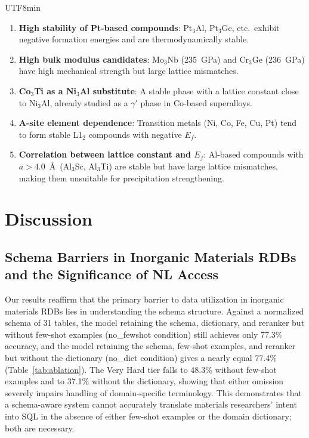 \documentclass[sn-mathphys,Numbered]{sn-jnl}
\begin{document}
\begin{CJK}{UTF8}{min}
\begin{enumerate}
  \item \textbf{High stability of Pt-based compounds}:
    Pt$_3$Al, Pt$_3$Ge, etc.\ exhibit negative formation energies
    and are thermodynamically stable.
  \item \textbf{High bulk modulus candidates}:
    Mo$_3$Nb (235~GPa) and Cr$_3$Ge (236~GPa) have high mechanical
    strength but large lattice mismatches.
  \item \textbf{Co$_3$Ti as a Ni$_3$Al substitute}:
    A stable phase with a lattice constant close to Ni$_3$Al,
    already studied as a $\gamma'$ phase in Co-based superalloys.
  \item \textbf{A-site element dependence}:
    Transition metals (Ni, Co, Fe, Cu, Pt) tend to form stable
    L1$_2$ compounds with negative $E_f$.
  \item \textbf{Correlation between lattice constant and $E_f$}:
    Al-based compounds with $a > 4.0$~\AA\ (Al$_3$Sc, Al$_3$Ti)
    are stable but have large lattice mismatches, making them
    unsuitable for precipitation strengthening.
\end{enumerate}

\section{Discussion}
\label{sec:discussion}

\subsection{Schema Barriers in Inorganic Materials RDBs and the Significance of NL Access}

Our results reaffirm that the primary barrier to data utilization
in inorganic materials RDBs lies in understanding the schema
structure.
Against a normalized schema of 31 tables, the model retaining the
schema, dictionary, and reranker but without few-shot examples
(no\_fewshot condition) still achieves only 77.3\% accuracy, and
the model retaining the schema, few-shot examples, and reranker
but without the dictionary (no\_dict condition) gives a nearly
equal 77.4\% (Table~\ref{tab:ablation}).
The Very Hard tier falls to 48.3\% without few-shot examples and
to 37.1\% without the dictionary, showing that either omission
severely impairs handling of domain-specific terminology.
This demonstrates that a schema-aware system cannot accurately
translate materials researchers' intent into SQL in the absence
of either few-shot examples or the domain dictionary; both are
necessary.


\end{CJK}
\end{document}

